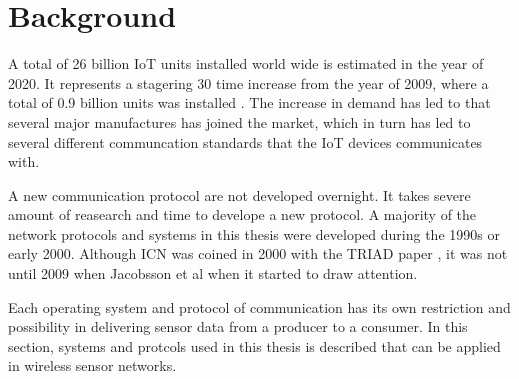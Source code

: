 \section{Background}

%


A total of 26 billion IoT units installed world wide is estimated in the year of 2020. It represents a stagering 30 time increase from the year of 2009, where a total of 0.9 billion units was installed \cite{Gartner}. The increase in demand has led to that several major manufactures has joined the market, which in turn has led to several different communcation standards that the IoT devices communicates with. 

A new communication protocol are not developed overnight. It takes severe amount of reasearch and time to develope a new protocol. A majority of the network protocols and systems in this thesis were developed during the 1990s or early 2000. Although ICN was coined in 2000 with the TRIAD paper \cite{TRIAD}, it was not until 2009 when Jacobsson et al \cite{Jacobson2009} when it started to draw attention.

Each operating system and protocol of communication has its own restriction and possibility in delivering sensor data from a producer to a consumer.
In this section, systems and protcols used in this thesis is described that can be applied in wireless sensor networks.







%

